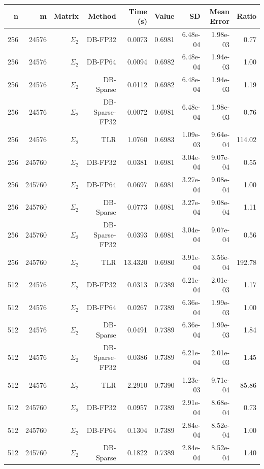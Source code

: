 \begin{tabular}{|r|r|r|r|r|r|r|r|r|}
  \hline
  \textbf{n} & \textbf{m} & \textbf{Matrix} & \textbf{Method} & \textbf{Time (s)} & \textbf{Value} & \textbf{SD} & \textbf{Mean Error} & \textbf{Ratio} \\
  \hline
  256 & 24576 & $\Sigma_2$ & DB-FP32 & 0.0073 & 0.6981 & 6.48e-04 & 1.98e-03 & 0.77 \\
  256 & 24576 & $\Sigma_2$ & DB-FP64 & 0.0094 & 0.6982 & 6.48e-04 & 1.94e-03 & 1.00 \\
  256 & 24576 & $\Sigma_2$ & DB-Sparse & 0.0112 & 0.6982 & 6.48e-04 & 1.94e-03 & 1.19 \\
  256 & 24576 & $\Sigma_2$ & DB-Sparse-FP32 & 0.0072 & 0.6981 & 6.48e-04 & 1.98e-03 & 0.76 \\
  256 & 24576 & $\Sigma_2$ & TLR & 1.0760 & 0.6983 & 1.09e-03 & 9.64e-04 & 114.02 \\
  256 & 245760 & $\Sigma_2$ & DB-FP32 & 0.0381 & 0.6981 & 3.04e-04 & 9.07e-04 & 0.55 \\
  256 & 245760 & $\Sigma_2$ & DB-FP64 & 0.0697 & 0.6981 & 3.27e-04 & 9.08e-04 & 1.00 \\
  256 & 245760 & $\Sigma_2$ & DB-Sparse & 0.0773 & 0.6981 & 3.27e-04 & 9.08e-04 & 1.11 \\
  256 & 245760 & $\Sigma_2$ & DB-Sparse-FP32 & 0.0393 & 0.6981 & 3.04e-04 & 9.07e-04 & 0.56 \\
  256 & 245760 & $\Sigma_2$ & TLR & 13.4320 & 0.6980 & 3.91e-04 & 3.56e-04 & 192.78 \\
  512 & 24576 & $\Sigma_2$ & DB-FP32 & 0.0313 & 0.7389 & 6.21e-04 & 2.01e-03 & 1.17 \\
  512 & 24576 & $\Sigma_2$ & DB-FP64 & 0.0267 & 0.7389 & 6.36e-04 & 1.99e-03 & 1.00 \\
  512 & 24576 & $\Sigma_2$ & DB-Sparse & 0.0491 & 0.7389 & 6.36e-04 & 1.99e-03 & 1.84 \\
  512 & 24576 & $\Sigma_2$ & DB-Sparse-FP32 & 0.0386 & 0.7389 & 6.21e-04 & 2.01e-03 & 1.45 \\
  512 & 24576 & $\Sigma_2$ & TLR & 2.2910 & 0.7390 & 1.23e-03 & 9.71e-04 & 85.86 \\
  512 & 245760 & $\Sigma_2$ & DB-FP32 & 0.0957 & 0.7389 & 2.91e-04 & 8.68e-04 & 0.73 \\
  512 & 245760 & $\Sigma_2$ & DB-FP64 & 0.1304 & 0.7389 & 2.84e-04 & 8.52e-04 & 1.00 \\
  512 & 245760 & $\Sigma_2$ & DB-Sparse & 0.1822 & 0.7389 & 2.84e-04 & 8.52e-04 & 1.40 \\

\end{tabular}
